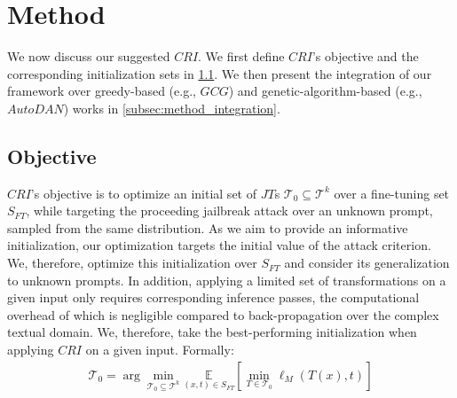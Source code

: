 \section{Method}
\label{section:method}
We now discuss our suggested $CRI$. We first define $CRI$'s objective and the corresponding initialization sets in \cref{subsec:objective}. We then present the integration of our framework over greedy-based (e.g., $GCG$) and genetic-algorithm-based (e.g., $AutoDAN$) works in \cref{subsec:method_integration}.


\subsection{Objective}
\label{subsec:objective}
$CRI$'s objective is to optimize an initial set of $JT$s $\mathcal{T}_0 \subseteq \mathcal{T}^k$ over a fine-tuning set $S_{FT}$, while targeting the proceeding jailbreak attack over an unknown prompt, sampled from the same distribution. As we aim to provide an informative initialization, our optimization targets the initial value of the attack criterion. We, therefore, optimize this initialization over $S_{FT}$ and consider its generalization to unknown prompts. In addition, applying a limited set of transformations on a given input only requires corresponding inference passes, the computational overhead of which is negligible compared to back-propagation over the complex textual domain. We, therefore, take the best-performing initialization when applying $CRI$ on a given input. Formally:
\begin{align}
    \mathcal{T}_0 = \arg\min_{\mathcal{T}_0 \subseteq \mathcal{T}^k} \underset{(x,t)\in S_{FT}}{\mathbb{E}} \left[ \min_{T\in \mathcal{T}_0} \ell_M(T(x),t) \right] \label{eq:objective}
\end{align}
